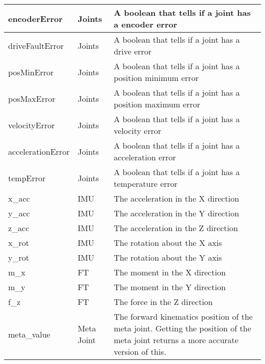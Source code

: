 \documentclass[12pt]{article}
\begin{document}
\begin{center}
\begin{longtable}{| l | l | p{7cm} |}
		encoderError & Joints & A boolean that tells if a joint has a encoder error \\ \hline
		
		driveFaultError & Joints & A boolean that tells if a joint has a drive error \\ \hline
		
		posMinError & Joints & A boolean that tells if a joint has a position minimum error \\ \hline
		
		posMaxError & Joints & A boolean that tells if a joint has a position maximum error \\ \hline
		
		velocityError & Joints & A boolean that tells if a joint has a velocity error \\ \hline
		
		accelerationError & Joints & A boolean that tells if a joint has a acceleration error \\ \hline
		
		tempError & Joints & A boolean that tells if a joint has a temperature error \\ \hline
		
		x\_acc & IMU & The acceleration in the X direction \\ \hline
		
		y\_acc & IMU & The acceleration in the Y direction \\ \hline
		
		z\_acc & IMU & The acceleration in the Z direction \\ \hline
		
		x\_rot & IMU & The rotation about the X axis\\ \hline
		
		y\_rot & IMU & The rotation about the Y axis\\ \hline
		
		m\_x & FT & The moment in the X direction \\ \hline
		
		m\_y & FT & The moment in the Y direction \\ \hline
		
		f\_z & FT & The force in the Z direction \\ \hline
		
		meta\_value & Meta Joint & The forward kinematics position of the meta joint. Getting the position of the meta joint returns a more accurate version of this. \\ \hline
		
		
	\end{longtable}
\end{center}
\end{document}

